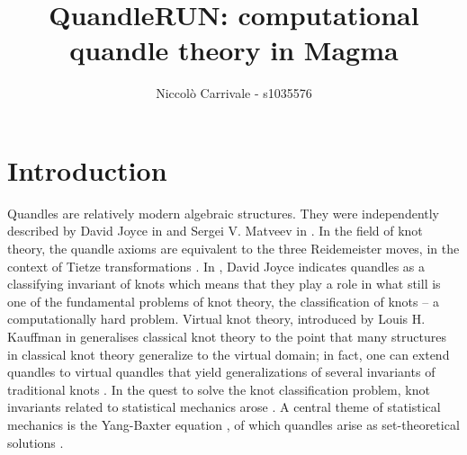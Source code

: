 \documentclass{mcom-l}
\begin{document}
\title{QuandleRUN: computational quandle theory in Magma}

\author{Niccolò Carrivale - s1035576}

\maketitle




\section{Introduction}
\noindent
Quandles are relatively modern algebraic structures. They were independently described by David Joyce in \cite{JOYCE198237} and Sergei V. Matveev in \cite{SergeiMatveevDisGrou}. In the field of knot theory, the quandle axioms are equivalent to the three Reidemeister moves, in the context of Tietze transformations \cite{lie2algebras, nelson2005signed}. \newline In \cite{JOYCE198237}, David Joyce indicates quandles as a classifying invariant of knots which means that they play a role in what still is one of the fundamental problems of knot theory, the classification of knots -- a computationally hard problem\label{intro1Connected}. Virtual knot theory, introduced by Louis H. Kauffman in \cite{kauffman2012introduction} generalises classical knot theory to the point that many structures in classical knot theory generalize to the virtual domain; in fact, one can extend quandles to virtual quandles that yield generalizations of several invariants of traditional knots \cite{kauffman2005virtual}.
In the quest to solve the knot classification problem, knot invariants related to statistical mechanics arose \cite{jones1989knot, kauffman1988statistical, turaev1990yang}. \newline A central theme of statistical mechanics is the Yang-Baxter equation \cite{wu1993yang}, of which quandles arise as set-theoretical solutions \cite{ETINGOF2001709}.  
\end{document}
